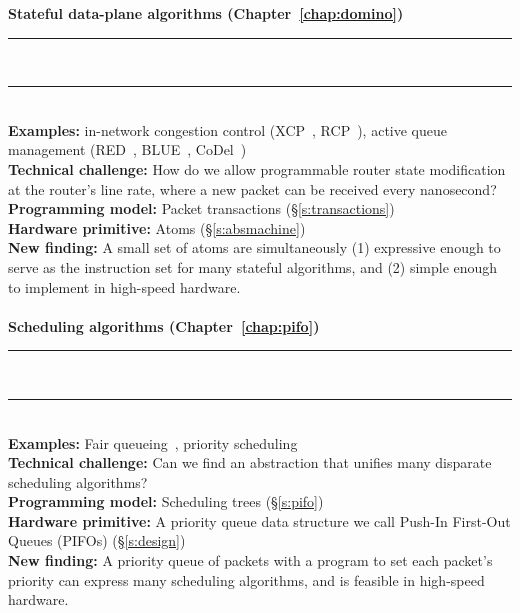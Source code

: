 \begin{table}
\textbf{Stateful data-plane algorithms (Chapter~\ref{chap:domino})}
\\[-7pt]\rule{\textwidth}{1pt}\\[-7pt]\rule{\textwidth}{1pt} \\
\textbf{Examples:} in-network congestion control (XCP~\cite{xcp}, RCP~\cite{rcp}), active
queue management (RED~\cite{red}, BLUE~\cite{blue}, CoDel~\cite{codel}) \\
\textbf{Technical challenge:} How do we allow programmable router state modification at
the router's line rate, where a new packet can be received every nanosecond? \\
\textbf{Programming model:} Packet transactions (\S\ref{s:transactions})\\
\textbf{Hardware primitive:} Atoms (\S\ref{s:absmachine}) \\
\textbf{New finding:} A small set of atoms are simultaneously (1) expressive enough to
serve as the instruction set for many stateful algorithms, and (2) simple
enough to implement in high-speed hardware. \\ \\

\textbf{Scheduling algorithms (Chapter~\ref{chap:pifo})}
\\[-7pt]\rule{\textwidth}{1pt}\\[-7pt]\rule{\textwidth}{1pt} \\
\textbf{Examples:} Fair queueing~\cite{wfq}, priority scheduling~\cite{srpt} \\
\textbf{Technical challenge:} Can we find an abstraction that unifies many disparate
scheduling algorithms? \\
\textbf{Programming model:} Scheduling trees (\S\ref{s:pifo}) \\
\textbf{Hardware primitive:} A priority queue data structure we call Push-In First-Out
Queues (PIFOs) (\S\ref{s:design}) \\
\textbf{New finding:} A priority queue of packets with a program to set each packet's
priority can express many scheduling algorithms, and is feasible in high-speed
hardware. \\\\


\end{table}
